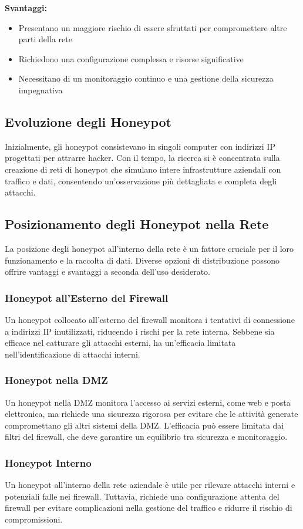 \textbf{Svantaggi:}
\begin{itemize}
    \item Presentano un maggiore rischio di essere sfruttati per compromettere altre parti della rete
    \item Richiedono una configurazione complessa e risorse significative
    \item Necessitano di un monitoraggio continuo e una gestione della sicurezza impegnativa
\end{itemize}

\subsection{Evoluzione degli Honeypot}

Inizialmente, gli honeypot consistevano in singoli computer con indirizzi IP progettati per attrarre hacker. Con il tempo, la ricerca si è concentrata sulla creazione di reti di honeypot che simulano intere infrastrutture aziendali con traffico e dati, consentendo un'osservazione più dettagliata e completa degli attacchi.

\subsection{Posizionamento degli Honeypot nella Rete}

La posizione degli honeypot all'interno della rete è un fattore cruciale per il loro funzionamento e la raccolta di dati. Diverse opzioni di distribuzione possono offrire vantaggi e svantaggi a seconda dell'uso desiderato.

\subsubsection{Honeypot all'Esterno del Firewall}

Un honeypot collocato all'esterno del firewall monitora i tentativi di connessione a indirizzi IP inutilizzati, riducendo i rischi per la rete interna. Sebbene sia efficace nel catturare gli attacchi esterni, ha un'efficacia limitata nell'identificazione di attacchi interni.

\subsubsection{Honeypot nella DMZ}

Un honeypot nella DMZ monitora l'accesso ai servizi esterni, come web e posta elettronica, ma richiede una sicurezza rigorosa per evitare che le attività generate compromettano gli altri sistemi della DMZ. L'efficacia può essere limitata dai filtri del firewall, che deve garantire un equilibrio tra sicurezza e monitoraggio.

\subsubsection{Honeypot Interno}

Un honeypot all'interno della rete aziendale è utile per rilevare attacchi interni e potenziali falle nei firewall. Tuttavia, richiede una configurazione attenta del firewall per evitare complicazioni nella gestione del traffico e ridurre il rischio di compromissioni.